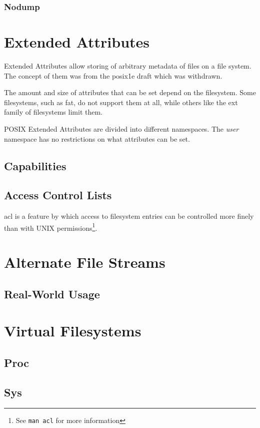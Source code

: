 \documentclass[a4paper]{article}
\begin{document}

\subsubsection{Nodump}

\section{Extended Attributes}

Extended Attributes allow storing of arbitrary metadata of files on a file system. The concept of them was from the \gls{posix}\.1e draft which was withdrawn.



The amount and size of attributes that can be set depend on the filesystem. Some filesystems, such as \gls{fat}, do not support them at all, while others like the \gls{ext} family of filesystems limit them.

POSIX Extended Attributes are divided into different namespaces. The \emph{user} namespace has no restrictions on what attributes can be set. 

\subsection{Capabilities}

\subsection{Access Control Lists}

\gls{acl} is a feature by which access to filesystem entries can be controlled more finely than with UNIX permissions\footnote{See \texttt{man acl} for more information}.


\section{Alternate File Streams}

\subsection{Real-World Usage}

\section{Virtual Filesystems}

\subsection{Proc}

\subsection{Sys}


\printglossaries
\end{document}
